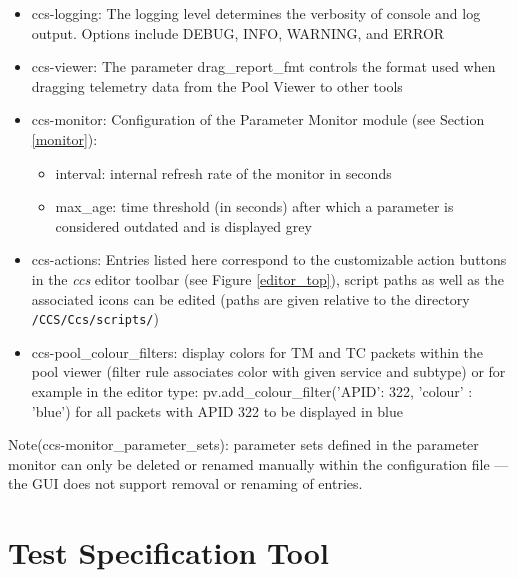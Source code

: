 \begin{itemize}
    \item ccs-logging: The logging level determines the verbosity of console and log output. Options include DEBUG, INFO, WARNING, and ERROR

    \item ccs-viewer: The parameter drag\_report\_fmt controls the format used when dragging telemetry data from the Pool Viewer to other tools

    \item ccs-monitor: Configuration of the Parameter Monitor module (see Section \ref{monitor}):

    \begin{itemize}
    \renewcommand\labelitemi{--} 
    \item interval: internal refresh rate of the monitor in seconds
  
    \item max\_age: time threshold (in seconds) after which a parameter is considered outdated and is displayed grey
    \end{itemize}

    \item ccs-actions: Entries listed here correspond to the customizable action buttons in the \textit{ccs} editor toolbar (see Figure \ref{editor_top}), script paths as well as the associated icons can be edited (paths are given relative to the directory \texttt{/CCS/Ccs/scripts/})

    \item ccs-pool\_colour\_filters: display colors for TM and TC packets within the pool viewer (filter rule associates color with given service and subtype) or for example in the editor type: pv.add\_colour\_filter({'APID': 322, 'colour' : 'blue'}) for all packets with APID 322 to be displayed in blue
    
\end{itemize}

Note(ccs-monitor\_parameter\_sets): parameter sets defined in the parameter monitor can only be deleted or renamed manually within the configuration file — the GUI does not support removal or renaming of entries.



\chapter{Test Specification Tool}

